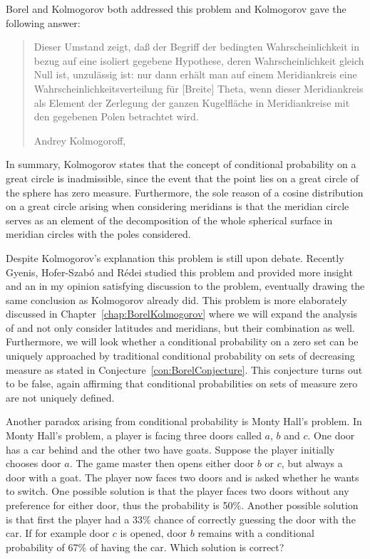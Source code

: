 \documentclass[a4paper]{report}
\theoremstyle{plain}
\theoremstyle{definition}
\theoremstyle{remark}
\numberwithin{equation}{chapter}
\DeclareMathOperator{\1}{\mathbbm{1}}
\begin{document}
Borel \cite{Borel09} and Kolmogorov \cite{Kolmogorov33} both addressed this problem and Kolmogorov gave the following answer:
\foreignblockquote{ngerman}[Andrey Kolmogoroff, \cite{Kolmogorov33}]{Dieser Umstand zeigt, daß der Begriff der bedingten Wahrscheinlichkeit in bezug auf eine isoliert gegebene Hypothese, deren Wahrscheinlichkeit gleich Null ist, unzulässig ist: nur dann erhält man auf einem Meridiankreis eine Wahrscheinlichkeitsverteilung für [Breite] Theta, wenn dieser Meridiankreis als Element der Zerlegung der ganzen Kugelfläche in Meridiankreise mit den gegebenen Polen betrachtet wird.}
In summary, Kolmogorov states that the concept of conditional probability on a great circle is inadmissible, since the event that the point lies on a great circle of the sphere has zero measure. Furthermore, the sole reason of a cosine distribution on a great circle arising when considering meridians is that the meridian circle serves as an element of the decomposition of the whole spherical surface in meridian circles with the poles considered.

Despite Kolmogorov's explanation this problem is still upon debate. Recently Gyenis, Hofer-Szabó and Rédei \cite{Gyenis17} studied this problem and provided more insight and an in my opinion satisfying discussion to the problem, eventually drawing the same conclusion as Kolmogorov already did. This problem is more elaborately discussed in Chapter~\ref{chap:BorelKolmogorov} where we will expand the analysis of \cite{Gyenis17} and not only consider latitudes and meridians, but their combination as well. Furthermore, we will look whether a conditional probability on a zero set can be uniquely approached by traditional conditional probability on sets of decreasing measure as stated in Conjecture~\ref{con:BorelConjecture}. This conjecture turns out to be false, again affirming that conditional probabilities on sets of measure zero are not uniquely defined.

Another paradox arising from conditional probability is Monty Hall's problem. In Monty Hall's problem, a player is facing three doors called $a$, $b$ and $c$. One door has a car behind and the other two have goats. Suppose the player initially chooses door $a$. The game master then opens either door $b$ or $c$, but always a door with a goat. The player now faces two doors and is asked whether he wants to switch. One possible solution is that the player faces two doors without any preference for either door, thus the probability is 50\%. Another possible solution is that first the player had a 33\% chance of correctly guessing the door with the car. If for example door $c$ is opened, door $b$ remains with a conditional probability of 67\% of having the car. Which solution is correct?
\end{document}
